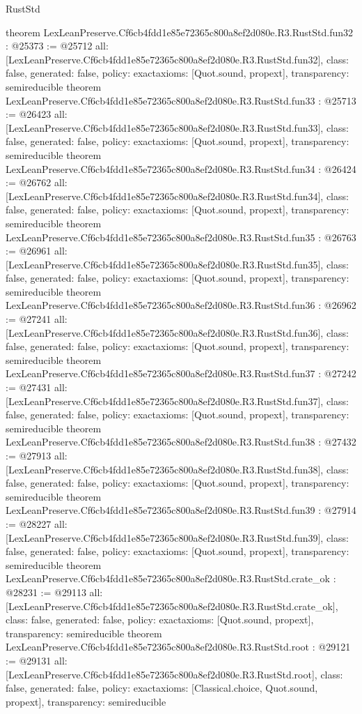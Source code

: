 \begin{lexlean}{RustStd}
\begin{coremodule}
{}
theorem LexLeanPreserve.Cf6cb4fdd1e85e72365c800a8ef2d080e.R3.RustStd.fun32 : @25373 := @25712 {
  all: [LexLeanPreserve.Cf6cb4fdd1e85e72365c800a8ef2d080e.R3.RustStd.fun32],
  class: false,
  generated: false,
  policy: exact{axioms: [Quot.sound, propext]},
  transparency: semireducible
}
theorem LexLeanPreserve.Cf6cb4fdd1e85e72365c800a8ef2d080e.R3.RustStd.fun33 : @25713 := @26423 {
  all: [LexLeanPreserve.Cf6cb4fdd1e85e72365c800a8ef2d080e.R3.RustStd.fun33],
  class: false,
  generated: false,
  policy: exact{axioms: [Quot.sound, propext]},
  transparency: semireducible
}
theorem LexLeanPreserve.Cf6cb4fdd1e85e72365c800a8ef2d080e.R3.RustStd.fun34 : @26424 := @26762 {
  all: [LexLeanPreserve.Cf6cb4fdd1e85e72365c800a8ef2d080e.R3.RustStd.fun34],
  class: false,
  generated: false,
  policy: exact{axioms: [Quot.sound, propext]},
  transparency: semireducible
}
theorem LexLeanPreserve.Cf6cb4fdd1e85e72365c800a8ef2d080e.R3.RustStd.fun35 : @26763 := @26961 {
  all: [LexLeanPreserve.Cf6cb4fdd1e85e72365c800a8ef2d080e.R3.RustStd.fun35],
  class: false,
  generated: false,
  policy: exact{axioms: [Quot.sound, propext]},
  transparency: semireducible
}
theorem LexLeanPreserve.Cf6cb4fdd1e85e72365c800a8ef2d080e.R3.RustStd.fun36 : @26962 := @27241 {
  all: [LexLeanPreserve.Cf6cb4fdd1e85e72365c800a8ef2d080e.R3.RustStd.fun36],
  class: false,
  generated: false,
  policy: exact{axioms: [Quot.sound, propext]},
  transparency: semireducible
}
theorem LexLeanPreserve.Cf6cb4fdd1e85e72365c800a8ef2d080e.R3.RustStd.fun37 : @27242 := @27431 {
  all: [LexLeanPreserve.Cf6cb4fdd1e85e72365c800a8ef2d080e.R3.RustStd.fun37],
  class: false,
  generated: false,
  policy: exact{axioms: [Quot.sound, propext]},
  transparency: semireducible
}
theorem LexLeanPreserve.Cf6cb4fdd1e85e72365c800a8ef2d080e.R3.RustStd.fun38 : @27432 := @27913 {
  all: [LexLeanPreserve.Cf6cb4fdd1e85e72365c800a8ef2d080e.R3.RustStd.fun38],
  class: false,
  generated: false,
  policy: exact{axioms: [Quot.sound, propext]},
  transparency: semireducible
}
theorem LexLeanPreserve.Cf6cb4fdd1e85e72365c800a8ef2d080e.R3.RustStd.fun39 : @27914 := @28227 {
  all: [LexLeanPreserve.Cf6cb4fdd1e85e72365c800a8ef2d080e.R3.RustStd.fun39],
  class: false,
  generated: false,
  policy: exact{axioms: [Quot.sound, propext]},
  transparency: semireducible
}
theorem LexLeanPreserve.Cf6cb4fdd1e85e72365c800a8ef2d080e.R3.RustStd.crate_ok : @28231 := @29113 {
  all: [LexLeanPreserve.Cf6cb4fdd1e85e72365c800a8ef2d080e.R3.RustStd.crate_ok],
  class: false,
  generated: false,
  policy: exact{axioms: [Quot.sound, propext]},
  transparency: semireducible
}
theorem LexLeanPreserve.Cf6cb4fdd1e85e72365c800a8ef2d080e.R3.RustStd.root : @29121 := @29131 {
  all: [LexLeanPreserve.Cf6cb4fdd1e85e72365c800a8ef2d080e.R3.RustStd.root],
  class: false,
  generated: false,
  policy: exact{axioms: [Classical.choice, Quot.sound, propext]},
  transparency: semireducible
}


\end{coremodule}
\end{lexlean}

